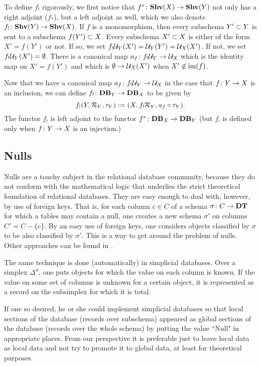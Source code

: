 \documentclass{amsart}
\begin{document}
To define $f_!$ rigorously, we first notice that $f^*\taking\Shv(X)\to\Shv(Y)$ not only has a right adjoint ($f_*$), but a left adjoint as well, which we also denote $f_!\taking\Shv(Y)\to\Shv(X)$.  If $f$ is a monomorphism, then every subschema $Y'\ss Y$ is sent to a subschema $f(Y')\ss X$.  Every subschema $X'\ss X$ is either of the form $X'=f(Y')$ or not.  If so, we set $f_!\mcU_Y(X')=\mcU_Y(Y')=\mcU_X(X')$.  If not, we set $f_!\mcU_Y(X')=\emptyset$.  There is a canonical map $a_f\taking f_!\mcU_Y\to\mcU_X$ which is the identity map on $X'=f(Y')$ and which is $\emptyset\to\mcU_X(X')$ when $X'\not\in\im(f)$.

Now that we have a canonical map $a_f\taking f_!\mcU_Y\to\mcU_X$ in the case that $f\taking Y\to X$ is an inclusion, we can define $f_!\taking\Data_Y\to\Data_X$ to be given by $$f_!(Y,\mcR_Y,\tau_Y):=(X,f_!\mcR_Y,a_f\circ\tau_Y).$$  The functor $f_!$ is left adjoint to the functor $f^*\taking\Data_X\to\Data_Y$ (but $f_!$ is defined only when $f\taking Y\to X$ is an injection.)

\subsection{Nulls}\label{subsec:nulls}

Nulls are a touchy subject in the relational database community, because they do not conform with the mathematical logic that underlies the strict theoretical foundation of relational databases.  They are easy enough to deal with, however, by use of foreign keys.  That is, for each column $c\in C$ of a schema $\sigma\taking C\to\DT$ for which a tables may contain a null, one creates a new schema $\sigma'$ on columns $C'=C-\{c\}$.  By an easy use of foreign keys, one considers objects classified by $\sigma$ to be also classified by $\sigma'$.  This is a way to get around the problem of nulls.  Other approaches can be found in \cite{JR}.

The same technique is done (automatically) in simplicial databases.  Over a simplex $\Delta^\sigma$, one puts objects for which the value on each column is known.  If the value on some set of columns is unknown for a certain object, it is represented as a record on the subsimplex for which it is total.  

If one so desired, he or she could implement simplicial databases so that local sections of the database (records over subschema) appeared as global sections of the database (records over the whole schema) by putting the value ``Null" in appropriate places.  From our perspective it is preferable just to leave local data as local data and not try to promote it to global data, at least for theoretical purposes.
\end{document}
